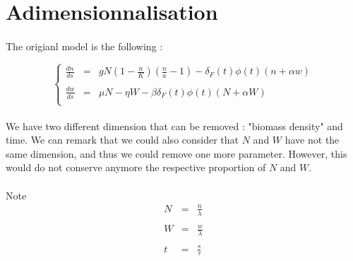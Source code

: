 \documentclass{article}
\begin{document}
\newpage
{}
%
%
%


%




\newpage
\appendix
{}

\newpage
\section{Adimensionnalisation}
\label{adim}

\paragraph{}
The origianl model is the following :

\[
\left\lbrace
\begin{array}{rcl}
\frac{dn}{ds} & = & gN(1-\frac{n}{K})(\frac{n}{a}-1) - \delta_F(t)\phi(t)(n+\alpha w) \\
\\
\frac{dw}{ds} & = & \mu N - \eta W - \beta\delta_F(t)\phi(t)(N+\alpha W) \\
\end{array}
\right.
\]

\paragraph{}
We have two different dimension that can be removed : "biomass density" and time. We can remark that we could also consider that $N$ and $W$ have not the same dimension, and thus we could remove one more parameter. However, this would do not conserve anymore the respective proportion of $N$ and $W$.

\paragraph{}
Note
\[
\begin{array}{rcl}
N & = & \frac{n}{\lambda} \\
\\
W & = & \frac{w}{\lambda} \\
\\
t & = & \frac{s}{\tau} \\
\end{array}
\]
\end{document}

